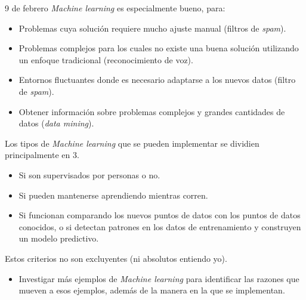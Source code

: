 \begin{entry}{9 de febrero}
\textit{Machine learning} es especialmente bueno, para:
\begin{itemize}
    \item Problemas cuya solución requiere mucho ajuste manual (filtros de \textit{spam}).
    \item Problemas complejos para los cuales no existe una buena solución utilizando un enfoque tradicional (reconocimiento de voz).
    \item Entornos fluctuantes donde es necesario adaptarse a los nuevos datos (filtro de \textit{spam}).
    \item Obtener información sobre problemas complejos y grandes cantidades de datos (\textit{data mining}).
\end{itemize}
Los tipos de \textit{Machine learning} que se pueden implementar se dividien principalmente en 3.
\begin{itemize}
    \item Si son supervisados por personas o no.
    \item Si pueden mantenerse aprendiendo mientras corren.
    \item Si funcionan comparando los nuevos puntos de datos con los puntos de datos conocidos, o si detectan patrones en los datos de entrenamiento y construyen un modelo predictivo.
\end{itemize}
Estos criterios no son excluyentes (ni absolutos entiendo yo).
\vspace{0.4em}
\tcbsubtitle{\LBltodo}\vspace{-1.25em}
\begin{itemize}
    \item Investigar más ejemplos de \textit{Machine learning} para identificar las razones que mueven a esos ejemplos, además de la manera en la que se implementan.
\end{itemize}
\end{entry}

